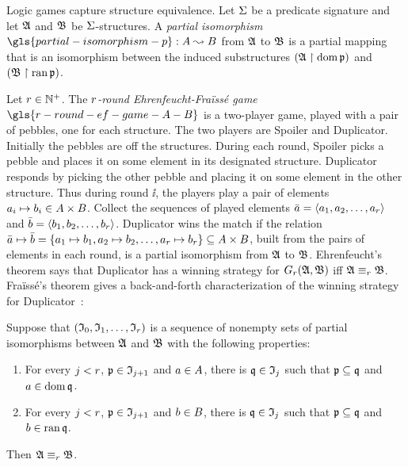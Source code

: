 Logic games capture structure equivalence.
Let $\mathrm{\Sigma}$ be a predicate signature and let $\mathfrak{A}$ and $\mathfrak{B}$ be
$\mathrm{\Sigma}$-structures.
A \emph{partial isomorphism} $\gls{partial-isomorphism-p} : \domA \pto \domB$
from $\mathfrak{A}$ to $\mathfrak{B}$ is a partial mapping that is an isomorphism between the 
induced substructures $(\mathfrak{A} \restriction \operatorname{dom} \mathfrak{p})$ and 
$(\mathfrak{B} \restriction \operatorname{ran} \mathfrak{p})$.

Let $r \in \mathbb{N}^{+}$.
The \emph{$r$-round Ehrenfeucht-Fra\"{i}ss\'{e} game}
$\gls{r-round-ef-game-A-B}$ is a two-player game, played with a pair of pebbles,
one for each structure. The two players are Spoiler and Duplicator.
Initially the pebbles are off the structures.
During each round, Spoiler picks a pebble
and places it on some element in its designated structure.
Duplicator responds by picking the other pebble and placing it on some
element in the other structure. Thus during round $\ii$, the players play a pair
of elements $a_{i} \mapsto b_{i} \in A \times B$. 
Collect the sequences of played elements $\bar{a} = \left\langle a_{1}, a_{2}, \dots,
a_{r} \right\rangle$ and $\bar{b} = \left\langle b_{1}, b_{2}, \dots, b_{r} \right\rangle$.
Duplicator wins the match if the
relation $\bar{a} \mapsto \bar{b} = \left\{a_{1} \mapsto b_{1}, a_{2} \mapsto
b_{2}, \dots, a_{r} \mapsto b_{r}\right\} \subseteq A \times B$, built from
the pairs of elements in each round, is a partial isomorphism from $\mathfrak{A}$ to
$\mathfrak{B}$.
Ehrenfeucht's theorem says that Duplicator has a winning strategy for
$G_{r}(\mathfrak{A},\mathfrak{B})$ iff $\mathfrak{A} \equiv_{r} \mathfrak{B}$.
Fra\"{i}ss\'{e}'s theorem gives a back-and-forth characterization of the winning
strategy for Duplicator~\cite[ch. 2]{ebbinghaus1999finite}:
\begin{theorem}\label{thm:game-ef}
Suppose that $(\mathfrak{I}_{0}, \mathfrak{I}_{1}, \dots, \mathfrak{I}_{r})$ is a sequence of nonempty
sets of partial isomorphisms between $\mathfrak{A}$ and $\mathfrak{B}$ with the following
properties:
\begin{enumerate}
  \item For every $j < r$, $\mathfrak{p} \in \mathfrak{I}_{j+1}$ and $a \in A$,
  there is $\mathfrak{q} \in \mathfrak{I}_{j}$ such that $\mathfrak{p} \subseteq \mathfrak{q}$ and
  $a \in \operatorname{dom}\mathfrak{q}$.
  \item For every $j < r$, $\mathfrak{p} \in \mathfrak{I}_{j+1}$ and $b \in B$,
  there is $\mathfrak{q} \in \mathfrak{I}_{j}$ such that $\mathfrak{p} \subseteq \mathfrak{q}$ and 
  $b \in \operatorname{ran}\mathfrak{q}$.
\end{enumerate}
Then $\mathfrak{A} \equiv_{r} \mathfrak{B}$.
\end{theorem}
